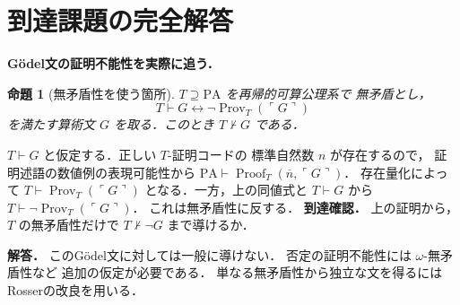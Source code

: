 \documentclass[a5paper,10pt,onecolumn]{jsarticle}
\makeatletter
\theoremstyle{mathnotetheorem}
\newtheorem{proposition}[theorem]{命題}
\renewcommand{\proofname}{証明}
\renewenvironment{proof}[1][\proofname]{%
  \par\pushQED{\qed}\normalfont\topsep4\p@\@plus2\p@\relax
  \trivlist\item[\hskip\labelsep\bfseries #1]\ignorespaces
}{\popQED\endtrivlist\@endpefalse}
\makeatother
\begin{document}
\section{到達課題の完全解答}
\noindent\textbf{Gödel文の証明不能性を実際に追う．}
\begin{proposition}[無矛盾性を使う箇所]
$T\supseteq\mathrm{PA}$ を再帰的可算公理系で
無矛盾とし，
\[
T\vdash G\leftrightarrow
\neg\operatorname{Prov}_T(\ulcorner G\urcorner)
\]
を満たす算術文 $G$ を取る．このとき
$T\not\vdash G$ である．
\end{proposition}
\begin{proof}
$T\vdash G$ と仮定する．正しい $T$-証明コードの
標準自然数 $n$ が存在するので，
証明述語の数値例の表現可能性から
$\mathrm{PA}\vdash\operatorname{Proof}_T(
\overline n,\ulcorner G\urcorner)$．
存在量化によって
$T\vdash\operatorname{Prov}_T(\ulcorner G\urcorner)$
となる．一方，上の同値式と $T\vdash G$ から
$T\vdash\neg\operatorname{Prov}_T(\ulcorner G\urcorner)$．
これは無矛盾性に反する．
\end{proof}
\noindent\textbf{到達確認．}
上の証明から，$T$ の無矛盾性だけで
$T\not\vdash\neg G$ まで導けるか．
\par\noindent\textbf{解答．}
このGödel文に対しては一般に導けない．
否定の証明不能性には $\omega$-無矛盾性など
追加の仮定が必要である．
単なる無矛盾性から独立な文を得るには
Rosserの改良を用いる．
\end{document}
